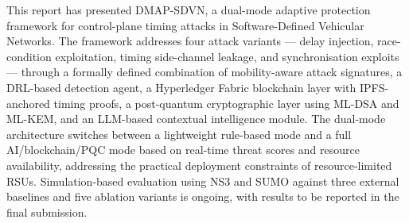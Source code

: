 This report has presented DMAP-SDVN, a dual-mode adaptive protection
framework for control-plane timing attacks in Software-Defined Vehicular
Networks. The framework addresses four attack variants — delay injection,
race-condition exploitation, timing side-channel leakage, and
synchronisation exploits — through a formally defined combination of
mobility-aware attack signatures, a DRL-based detection agent, a
Hyperledger Fabric blockchain layer with IPFS-anchored timing proofs,
a post-quantum cryptographic layer using ML-DSA and ML-KEM, and an
LLM-based contextual intelligence module. The dual-mode architecture
switches between a lightweight rule-based mode and a full AI/blockchain/PQC
mode based on real-time threat scores and resource availability,
addressing the practical deployment constraints of resource-limited RSUs.
Simulation-based evaluation using NS3 and SUMO against three external
baselines and five ablation variants is ongoing, with results to be
reported in the final submission.